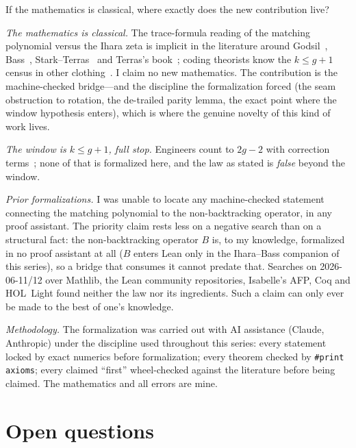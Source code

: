 \documentclass[11pt]{article}
\newcommand{\lean}[1]{\texttt{#1}}
\begin{document}
If the mathematics is classical, where exactly does the new contribution live?

\emph{The mathematics is classical.} The trace-formula reading of the matching polynomial
versus the Ihara zeta is implicit in the literature around
Godsil~\cite{Godsil1981,GodsilBook}, Bass~\cite{Bass1992}, Stark--Terras~\cite{StarkTerras1996}
and Terras's book~\cite{Terras2011}; coding theorists know the $k \le g+1$ census in other
clothing~\cite{BlakeLin2018}. I claim no new mathematics. The contribution is the
machine-checked bridge---and the discipline the formalization forced (the seam obstruction
to rotation, the de-trailed parity lemma, the exact point where the window hypothesis
enters), which is where the genuine novelty of this kind of work lives.

\emph{The window is $k \le g+1$, full stop.} Engineers count to $2g-2$ with correction
terms~\cite{BlakeLin2018,Dehghan2018}; none of that is formalized here, and the law as
stated is \emph{false} beyond the window.

\emph{Prior formalizations.} I was unable to locate any machine-checked statement connecting
the matching polynomial to the non-backtracking operator, in any proof assistant. The
priority claim rests less on a negative search than on a structural fact: the
non-backtracking operator $B$ is, to my knowledge, formalized in no proof assistant at all
($B$ enters Lean only in the Ihara--Bass companion of this series), so a bridge that consumes
it cannot predate that. Searches on 2026-06-11/12 over Mathlib, the Lean community repositories,
Isabelle's AFP, Coq and HOL~Light found neither the law nor its ingredients. Such a claim
can only ever be made to the best of one's knowledge.

\emph{Methodology.} The formalization was carried out with AI assistance (Claude,
Anthropic) under the discipline used throughout this series: every statement locked by exact
numerics before formalization; every theorem checked by \lean{\#print axioms}; every claimed
``first'' wheel-checked against the literature before being claimed. The mathematics and all
errors are mine.

\section{Open questions}
\label{sec:questions}
\end{document}
